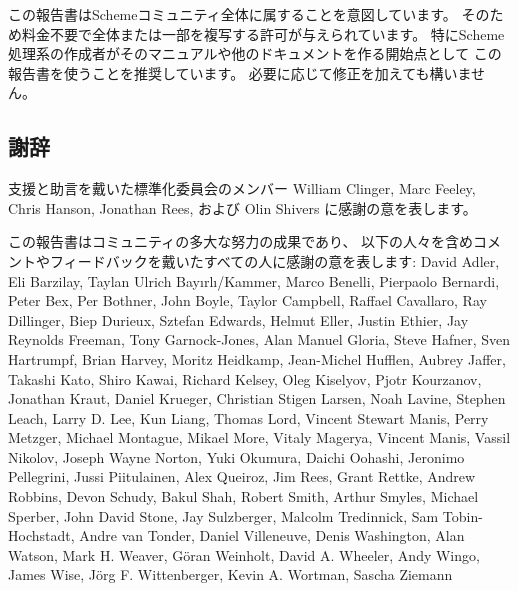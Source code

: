 \medskip

この報告書はSchemeコミュニティ全体に属することを意図しています。
そのため料金不要で全体または一部を複写する許可が与えられています。
特にScheme処理系の作成者がそのマニュアルや他のドキュメントを作る開始点として
この報告書を使うことを推奨しています。
必要に応じて修正を加えても構いません。




\subsection*{謝辞}

支援と助言を戴いた標準化委員会のメンバー
William Clinger, Marc Feeley, Chris Hanson, Jonathan Rees, および Olin Shivers
に感謝の意を表します。

この報告書はコミュニティの多大な努力の成果であり、
以下の人々を含めコメントやフィードバックを戴いたすべての人に感謝の意を表します:
David Adler, Eli Barzilay, Taylan Ulrich
Bay\i{}rl\i/Kammer, Marco Benelli, Pierpaolo Bernardi,
Peter Bex, Per Bothner, John Boyle, Taylor Campbell, Raffael Cavallaro,
Ray Dillinger, Biep Durieux, Sztefan Edwards, Helmut Eller, Justin
Ethier, Jay Reynolds Freeman, Tony Garnock-Jones, Alan Manuel Gloria,
Steve Hafner, Sven Hartrumpf, Brian Harvey, Moritz Heidkamp, Jean-Michel
Hufflen, Aubrey Jaffer, Takashi Kato, Shiro Kawai, Richard Kelsey, Oleg
Kiselyov, Pjotr Kourzanov, Jonathan Kraut, Daniel Krueger, Christian
Stigen Larsen, Noah Lavine, Stephen Leach, Larry D. Lee, Kun Liang,
Thomas Lord, Vincent Stewart Manis, Perry Metzger, Michael Montague,
Mikael More, Vitaly Magerya, Vincent Manis, Vassil Nikolov, Joseph
Wayne Norton, Yuki Okumura, Daichi Oohashi, Jeronimo Pellegrini, Jussi
Piitulainen, Alex Queiroz, Jim Rees, Grant Rettke, Andrew Robbins, Devon
Schudy, Bakul Shah, Robert Smith, Arthur Smyles, Michael Sperber, John
David Stone, Jay Sulzberger, Malcolm Tredinnick, Sam Tobin-Hochstadt,
Andre van Tonder, Daniel Villeneuve, Denis Washington, Alan Watson,
Mark H.  Weaver, G\"oran Weinholt, David A. Wheeler, Andy Wingo, James
Wise, J\"org F. Wittenberger, Kevin A. Wortman, Sascha Ziemann

